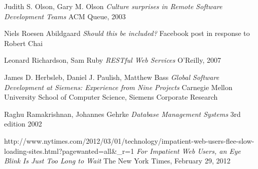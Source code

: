 \begin{thebibliography}{9}

		Judith S. Olson, Gary M. Olson\newline
		\emph{Culture surprises in Remote Software Development Teams}\newline
		ACM Queue, 2003

		Niels Roesen Abildgaard\newline
		\emph{Should this be included?}\newline
		Facebook post in response to Robert Chai

        Leonard Richardson, Sam Ruby\newline
        \emph{RESTful Web Services}
        O'Reilly, 2007
    
		James D. Herbsleb, Daniel J. Paulish, Matthew Bass\newline
		\emph{Global Software Development at Siemens: Experience from Nine Projects}
		Carnegie Mellon University School of Computer Science,
		Siemens Corporate Research 
	
		Raghu Ramakrishnan, Johannes Gehrke\newline
		\emph{Database Management Systems}\newline
		3rd edition 2002

		http://www.nytimes.com/2012/03/01/technology/impatient-web-users-flee-slow-loading-sites.html?pagewanted=all\&_r=1\newline
		\emph{For Impatient Web Users, an Eye Blink Is Just Too Long to Wait}\newline
		The New York Times, February 29, 2012

\end{thebibliography}
